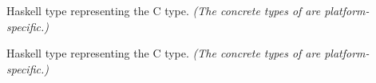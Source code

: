 \begin{haddockdesc}
\item[\begin{tabular}{@{}l}
data CInt
\end{tabular}]
{\haddockbegindoc
Haskell type representing the C  type.
 \emph{(The concrete types of  are platform-specific.)}\par}
\end{haddockdesc}
\begin{haddockdesc}
\item[\begin{tabular}{@{}l}
instance Bits CInt\\instance Bounded CInt\\instance Enum CInt\\instance Storable CInt\\instance Ix CInt\\instance Num CInt\\instance Read CInt\\instance Integral CInt\\instance Real CInt\\instance Show CInt\\instance Eq CInt\\instance Ord CInt
\end{tabular}]
\end{haddockdesc}
\begin{haddockdesc}
\item[\begin{tabular}{@{}l}
data CUInt
\end{tabular}]
{\haddockbegindoc
Haskell type representing the C  type.
 \emph{(The concrete types of  are platform-specific.)}\par}
\end{haddockdesc}
\begin{haddockdesc}
\item[\begin{tabular}{@{}l}
instance Bits CUInt\\instance Bounded CUInt\\instance Enum CUInt\\instance Storable CUInt\\instance Ix CUInt\\instance Num CUInt\\instance Read CUInt\\instance Integral CUInt\\instance Real CUInt\\instance Show CUInt\\instance Eq CUInt\\instance Ord CUInt
\end{tabular}]
\end{haddockdesc}
